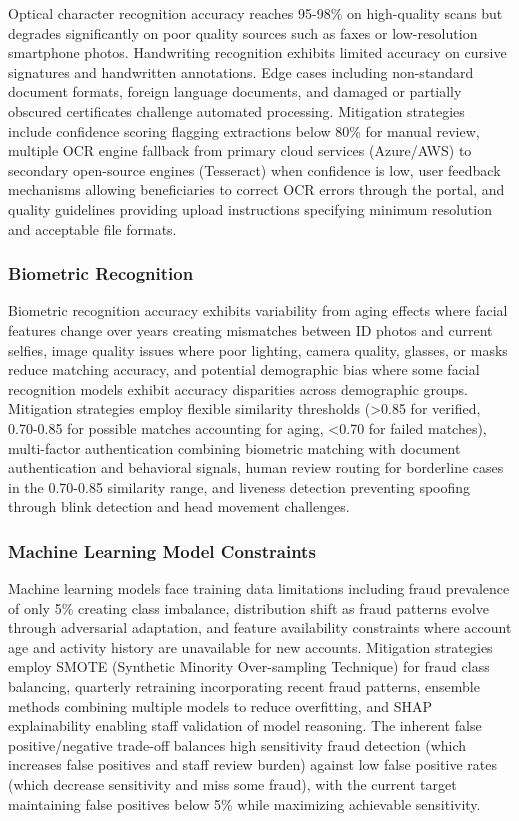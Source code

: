 Optical character recognition accuracy reaches 95-98\% on high-quality scans but degrades significantly on poor quality sources such as faxes or low-resolution smartphone photos. Handwriting recognition exhibits limited accuracy on cursive signatures and handwritten annotations. Edge cases including non-standard document formats, foreign language documents, and damaged or partially obscured certificates challenge automated processing. Mitigation strategies include confidence scoring flagging extractions below 80\% for manual review, multiple OCR engine fallback from primary cloud services (Azure/AWS) to secondary open-source engines (Tesseract) when confidence is low, user feedback mechanisms allowing beneficiaries to correct OCR errors through the portal, and quality guidelines providing upload instructions specifying minimum resolution and acceptable file formats.

\subsubsection{Biometric Recognition}

Biometric recognition accuracy exhibits variability from aging effects where facial features change over years creating mismatches between ID photos and current selfies, image quality issues where poor lighting, camera quality, glasses, or masks reduce matching accuracy, and potential demographic bias where some facial recognition models exhibit accuracy disparities across demographic groups. Mitigation strategies employ flexible similarity thresholds (>0.85 for verified, 0.70-0.85 for possible matches accounting for aging, <0.70 for failed matches), multi-factor authentication combining biometric matching with document authentication and behavioral signals, human review routing for borderline cases in the 0.70-0.85 similarity range, and liveness detection preventing spoofing through blink detection and head movement challenges.

\subsubsection{Machine Learning Model Constraints}

Machine learning models face training data limitations including fraud prevalence of only 5\% creating class imbalance, distribution shift as fraud patterns evolve through adversarial adaptation, and feature availability constraints where account age and activity history are unavailable for new accounts. Mitigation strategies employ SMOTE (Synthetic Minority Over-sampling Technique) for fraud class balancing, quarterly retraining incorporating recent fraud patterns, ensemble methods combining multiple models to reduce overfitting, and SHAP explainability enabling staff validation of model reasoning. The inherent false positive/negative trade-off balances high sensitivity fraud detection (which increases false positives and staff review burden) against low false positive rates (which decrease sensitivity and miss some fraud), with the current target maintaining false positives below 5\% while maximizing achievable sensitivity.

